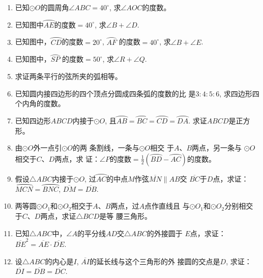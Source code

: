 \begin{ex}
\begin{enumerate}
    \item 已知$\odot O$的圆周角$\angle ABC=40^{\circ}$, 求$\angle AOC$的度数。
    \item 已知图中$\wideparen{AE}$的度数$=40^{\circ}$, 求$\angle B+\angle D$.
    \item 已知图中，$\wideparen{CD}$的度数$=20^{\circ}$, $\wideparen{AF}$
    的度数$=40^{\circ}$, 求$\angle B+\angle E$.
    \item 已知图中，$\wideparen{SP}$
    的度数$=50^{\circ}$, 求$\angle R+\angle Q$.
    \item 求证两条平行的弦所夹的弧相等。
    \item 已知圆内接四边形的四个顶点分圆成四条弧的度数的比
    是$3:4:5:6$, 求四边形四个内角的度数。
    \item 已知四边形$ABCD$内接于$\odot O$, 且$\wideparen{AB}=\wideparen{BC}=\wideparen{CD}=\wideparen{DA}$.
    求证$ABCD$是正方形。
\item 由$\odot O$外一点引$\odot O$的两
条割线，一条与$\odot O$相交
于$A$、$B$两点，另一条与
$\odot O$相交于$C$、$D$两点，求
证：$\angle P$的度数$=\frac{1}{2}\left(\wideparen{BD}-\wideparen{AC}\right)$的度数。
\item 假设$\triangle ABC$内接于$\odot O$, 过$\wideparen{AC}$的中点$M$作弦$\overline{MN}\parallel AB$交
$\overline{BC}$于$D$点，求证：$\wideparen{MCN}=\wideparen{BNC}$, $\overline{DM}=\overline{DB}$.
\item 两等圆$\odot O_1$和$\odot O_2$相交于$A$、$B$两点，过$A$点作直线且
与$\odot O_1$和$\odot O_2$分别相交于$C$、$D$两点，求证$\triangle BCD$是等
腰三角形。
\item 已知$\triangle ABC$中，$\angle A$的平分线$AD$交$\triangle ABC$的外接圆于
$E$点，求证：$\overline{BE}^2=\overline{AE}\cdot \overline{DE}$.
\item 设$\triangle ABC$的内心是$I$, $\overline{AI}$的延长线与这个三角形的外
接圆的交点是$D$, 求证：$\overline{DI}=\overline{DB}=\overline{DC}$.
\end{enumerate}
\end{ex}

